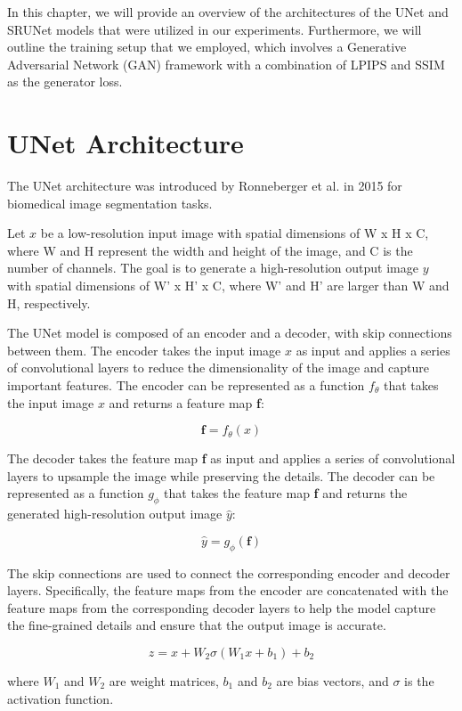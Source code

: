 \label{chap:Architectures}

In this chapter, we will provide an overview of the architectures of the UNet and SRUNet models that were utilized in our experiments. Furthermore, we will outline the training setup that we employed, which involves a Generative Adversarial Network (GAN) framework with a combination of LPIPS and SSIM as the generator loss.

\section{UNet Architecture}

The UNet architecture was introduced by Ronneberger et al. \cite{ronneberger2015u} in 2015 for biomedical image segmentation tasks.

Let $x$ be a low-resolution input image with spatial dimensions of W x H x C, where W and H represent the width and height of the image, and C is the number of channels. The goal is to generate a high-resolution output image $y$ with spatial dimensions of W' x H' x C, where W' and H' are larger than W and H, respectively.

The UNet model is composed of an encoder and a decoder, with skip connections between them. The encoder takes the input image $x$ as input and applies a series of convolutional layers to reduce the dimensionality of the image and capture important features. The encoder can be represented as a function $f_\theta$ that takes the input image $x$ and returns a feature map \textbf{f}:

$$ \textbf{f} = f_\theta(x) $$

The decoder takes the feature map \textbf{f} as input and applies a series of convolutional layers to upsample the image while preserving the details. The decoder can be represented as a function $g_\phi$ that takes the feature map \textbf{f} and returns the generated high-resolution output image $\hat{y}$:

$$ \hat{y} = g_\phi(\textbf{f}) $$

The skip connections are used to connect the corresponding encoder and decoder layers. Specifically, the feature maps from the encoder are concatenated with the feature maps from the corresponding decoder layers to help the model capture the fine-grained details and ensure that the output image is accurate.

$$ z = x + W_2\sigma(W_1 x + b_1) + b_2 $$

where $W_1$ and $W_2$ are weight matrices, $b_1$ and $b_2$ are bias vectors, and $\sigma$ is the activation function.


